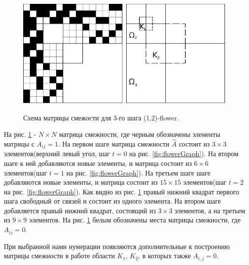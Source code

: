 \documentclass[10pt,aps,pra]{revtex4-1}
\begin{document}
\begin{figure}[H]
\label{fig:flowerMatrix}
\centering
\includegraphics[height=5.5cm]{graphics/first_all.png}
\includegraphics[height=5.5cm]{graphics/second.png}
\caption{Схема матрицы смежости для 3-го шага (1,2)-flower.}
\end{figure}

На рис. \ref{fig:flowerMatrix} - $N \times N$ матрица смежности, где черным обозначены элементы матрицы с $A_{ij}=1$. На первом шаге матрица смежности $\hat{A}$ состоит из $3 \times 3$ элементов(верхний левый угол, шаг $t=0$ на рис. \ref{fig:flowerGraph}). На втором шаге к ней добавляются новые элементы, и матрица состоит из $6 \times 6$ элементов(шаг $t=1$ на рис. \ref{fig:flowerGraph}). На третьем шаге шаге добавляются новые элементы, и матрица состоит из $15 \times 15$ элементов(шаг $t=2$ на рис. \ref{fig:flowerGraph}). Как видно из рис. \ref{fig:flowerMatrix} правый нижний квадрат первого шага свободный от связей и состоит из одного элемента. На втором шаге добавляется правый нижний квадрат, состоящий из $3 \times 3$ элементов, а на третьем из $9 \times 9$ элементов. На рис. \ref{fig:flowerMatrix} белым обозначены места матрицы смежности, где $A_{ij}=0$.

При выбранной нами нумерации появляются дополнительные к построению матрицы смежности в работе \cite{Dor1} области $K_1$, $K_2$, в которых также $A_{i,j}=0$. 
\end{document}
